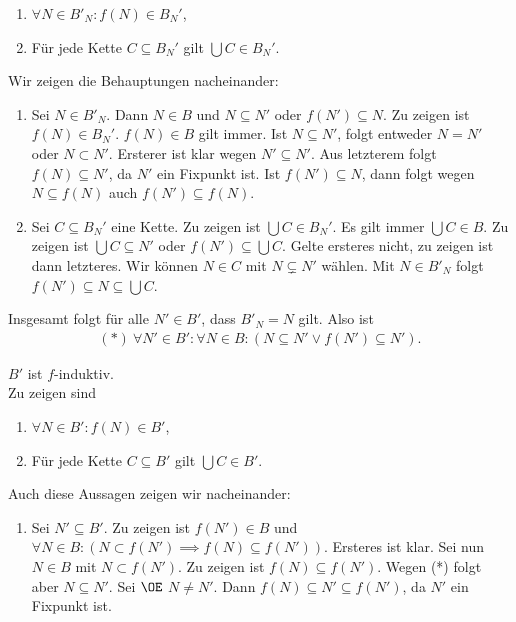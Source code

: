 \documentclass[../../main.tex]{subfiles}
\begin{document}
\begin{cproof}
\begin{tcolorbox}[arc=0mm, boxrule=0.2mm]
\begin{enumerate}[\normalfont(b)]
				\item $\forall N\in B'_N: f(N)\in B_N'$,
				\item Für jede Kette $C\subseteq B_N'$ gilt $\bigcup C\in B_N'$.
			\end{enumerate}
			Wir zeigen die Behauptungen nacheinander:
			\begin{enumerate}[\normalfont(b)]
				\item Sei $N\in B'_N$. Dann $N\in B$ und $N\subseteq N'$ oder $f(N')\subseteq N$. Zu zeigen ist $f(N)\in B_N'$. $f(N)\in B$ gilt immer. Ist $N\subseteq N'$, folgt entweder $N=N'$ oder $N\subset N'$. Ersterer ist klar wegen $N'\subseteq N'$. Aus letzterem folgt $f(N)\subseteq N'$, da $N'$ ein Fixpunkt ist. Ist $f(N')\subseteq N$, dann folgt wegen $N\subseteq f(N)$ auch $f(N')\subseteq f(N)$.
				\item Sei $C\subseteq B_N'$ eine Kette. Zu zeigen ist $\bigcup C\in B_N'$. Es gilt immer $\bigcup C\in B$. Zu zeigen ist $\bigcup C\subseteq N'$ oder $f(N')\subseteq \bigcup C$. Gelte ersteres nicht, zu zeigen ist dann letzteres. Wir können $N\in C$ mit $N\subsetneq N'$ wählen. Mit $N\in B'_N$ folgt $f(N')\subseteq N\subseteq \bigcup C$.
			\end{enumerate}
	\end{tcolorbox}
	Insgesamt folgt für alle $N'\in B'$, dass $B'_N=N$ gilt. Also ist
	\begin{align*}
		(*)\ \forall N'\in B': \forall N\in B: (N\subseteq N'\lor f(N')\subseteq N').
	\end{align*}
	\begin{tcolorbox}[arc=0mm, boxrule=0.2mm]
			$B'$ ist $f$-induktiv. \\
			Zu zeigen sind 
			\begin{enumerate}[\normalfont(a)]
				\item $\forall N\in B': f(N)\in B'$,
				\item Für jede Kette $C\subseteq B'$ gilt $\bigcup C\in B'$.
			\end{enumerate}
			Auch diese Aussagen zeigen wir nacheinander:
			\begin{enumerate}[\normalfont(a)]
				\item Sei $N'\subseteq B'$. Zu zeigen ist $f(N')\in B$ und $\forall N\in B: (N\subset f(N')\implies f(N)\subseteq f(N'))$. Ersteres ist klar. Sei nun $N\in B$ mit $N\subset f(N')$. Zu zeigen ist $f(N)\subseteq f(N')$. Wegen (*) folgt aber $N\subseteq N'$. Sei $\OE$ $N\neq N'$. Dann $f(N)\subseteq N'\subseteq f(N')$, da $N'$ ein Fixpunkt ist.

\end{enumerate}
\end{tcolorbox}
\end{cproof}
\end{document}
